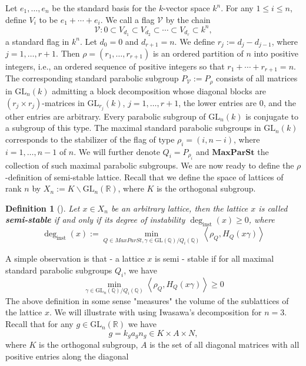 \documentclass[12pt]{article} %
\newtheorem{definition}{Definition}[section]
\begin{document}
Let \( e_1, \ldots, e_n \) be the standard basis for the \( k \)-vector space \( k^n \). For any \( 1 \leq i \leq n \), define \( V_i \) to be \( e_1 + \cdots + e_i \). We call a flag \( \mathcal{V} \) by the chain
\[
    \mathcal{V}: 0 \subset V_{d_1} \subset V_{d_2} \subset \cdots \subset V_{d_r} \subset k^n,
\]
a standard flag in \( k^n \). Let \( d_0 = 0 \) and \( d_{r+1} = n \). We define \( r_j := d_j - d_{j-1} \), where \( j = 1, \ldots, r+1 \). Then \( \rho = (r_1, \ldots, r_{r+1}) \) is an ordered partition of \( n \) into positive integers, i.e., an ordered sequence of positive integers so that \( r_1 + \cdots + r_{r+1} = n \). The corresponding standard parabolic subgroup \( P_{\mathcal{V}} := P_{\rho} \) consists of all matrices in \( \text{GL}_n(k) \) admitting a block decomposition whose diagonal blocks are \( (r_j \times r_j) \)-matrices in \( \text{GL}_{r_j}(k) \), \( j = 1, \ldots, r+1 \), the lower entries are 0, and the other entries are arbitrary. Every parabolic subgroup of \( \text{GL}_n(k) \) is conjugate to a subgroup of this type.
The maximal standard parabolic subgroups in $\text{GL}_n(k)$ corresponds to the
stabilizer of the flag of type $\rho_i =(i,n-i)$, where $i = 1,\ldots,n-1$ of $n$. We will
further denote $Q_i = P_{\rho_i}$ and $\textbf{MaxParSt}$ the collection of such maximal parabolic subgroups.
We are now ready to define the $\rho$-definition of semi-stable lattice. Recall that
we define the space of lattices of rank $n$ by $X_n := K \backslash \text{GL}_n(\mathbb{R})$, where $K$ is the orthogonal subgroup.
\begin{definition}[\label  = $\rho$-definition]\label{ss2}
    Let $x \in X_n$ be an arbitrary lattice, then the lattice $x$ is called \textbf{semi-stable} if and only if its degree of instability $\deg_{\text{inst}}(x)\ge 0$, where
    \[\deg_{\text{inst}}(x):= \min_{Q \in MaxParSt, \gamma \in \text{GL}(\mathbb{Q})/Q_i(\mathbb{Q})}\left\langle \rho_Q, H_Q(x\gamma) \right\rangle\]
\end{definition}
A simple observation is that - a lattice $x$ is semi - stable if for all maximal standard parabolic subgroups
$Q_i$, we have
\[\min_{\gamma \in \text{GL}_n(\mathbb{Q})/Q_i(\mathbb{Q})}\left\langle \rho_Q, H_Q(x\gamma) \right\rangle \ge 0\]
The above definition in some sense "measures" the volume of the sublattices of the lattice $x$.
We will illustrate with using Iwasawa's decomposition for $n=3$. Recall that for any $g \in \text{GL}_n(\mathbb{R})$ we have
\[ g = k_ga_gn_g \in K \times A \times N,\]
where $K$ is the orthogonal subgroup, $A$ is the set of all diagonal matrices with all positive entries along the diagonal
\end{document}
